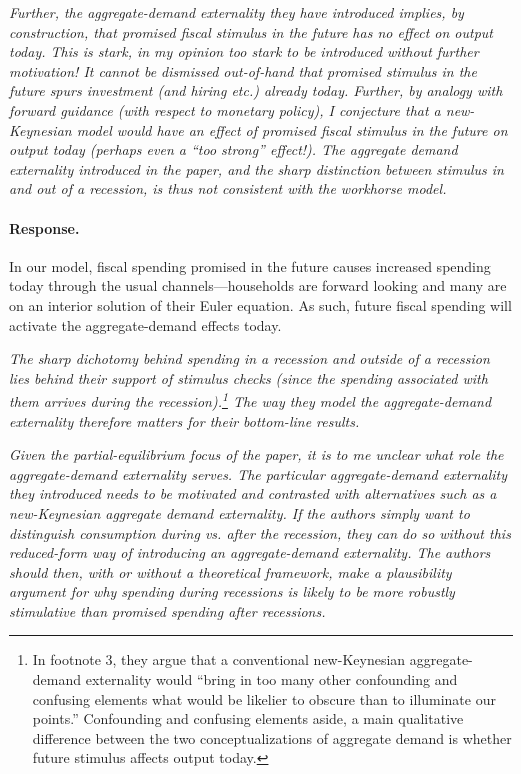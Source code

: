 \documentclass[12pt,letterpaper,english]{article}
\begin{document}
\begin{enumerate}
	\textit{Further, the aggregate-demand externality they have introduced implies,	by construction, that promised fiscal stimulus in the future has no effect on output today. This is stark, in my opinion too stark to be introduced without further motivation! It cannot be dismissed out-of-hand that promised stimulus in the future spurs investment (and hiring etc.) already today. Further, by analogy with forward guidance (with respect to monetary policy), I conjecture that a new-Keynesian model would have an effect of promised fiscal stimulus in the future on output today (perhaps even a ``too strong'' effect!). The aggregate demand externality introduced in the paper, and the sharp distinction	between stimulus in and out of a recession, is thus not consistent with	the workhorse model.}
	
	\paragraph{Response.} In our model, fiscal spending promised in the future causes increased spending today through the usual channels---households are forward looking and many are on an interior solution of their Euler equation. As such, future fiscal spending will activate the aggregate-demand effects today.
	
	\textit{The sharp dichotomy behind spending in a recession and outside of a recession lies behind their support of stimulus checks (since the spending	associated with them arrives during the recession).\footnote{In footnote 3, they argue that a conventional new-Keynesian aggregate-demand externality would ``bring in too many other confounding and confusing elements what would be likelier to obscure than to illuminate our points.'' Confounding and confusing elements aside, a main qualitative difference between the two conceptualizations of aggregate demand is whether future stimulus affects output today.} The way they model the aggregate-demand externality therefore matters for their bottom-line results.}
	
	\textit{Given the partial-equilibrium focus of the paper, it is to me unclear what role the aggregate-demand externality serves. The particular	aggregate-demand externality they introduced needs to be motivated and contrasted with alternatives such as a new-Keynesian aggregate demand externality. If the authors simply want to distinguish consumption	during vs. after the recession, they can do so without this	reduced-form way of introducing an aggregate-demand externality. The	authors should then, with or without a theoretical framework, make a plausibility argument for why spending during recessions is likely to be more robustly stimulative than promised spending after recessions.}
	

\end{enumerate}
\end{document}
